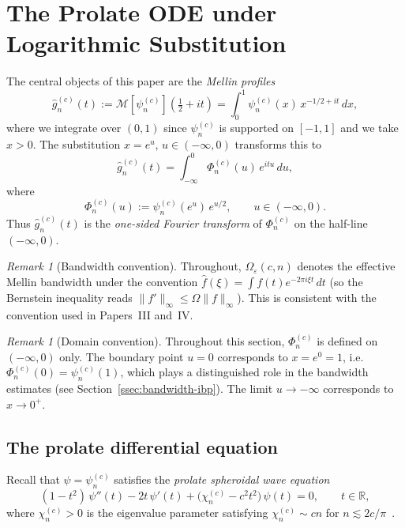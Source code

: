 \documentclass[12pt,a4paper]{amsart}
\theoremstyle{remark}
\newtheorem{remark}[theorem]{Remark}
\begin{document}
\section{The Prolate ODE under Logarithmic Substitution}
\label{sec:ode-transform}

The central objects of this paper are the \emph{Mellin profiles}
\[
\widehat{g}_n^{(c)}(t)
:= \mathcal{M}[\psi_n^{(c)}]\!\left(\tfrac{1}{2}+it\right)
= \int_0^1 \psi_n^{(c)}(x)\,x^{-1/2+it}\,dx,
\]
where we integrate over $(0,1)$ since $\psi_n^{(c)}$ is supported
on $[-1,1]$ and we take $x > 0$.
The substitution $x = e^u$, $u \in (-\infty, 0)$ transforms this to
\begin{equation}
\label{eq:Mellin-Phi}
\widehat{g}_n^{(c)}(t)
= \int_{-\infty}^{0} \Phi_n^{(c)}(u)\,e^{itu}\,du,
\end{equation}
where
\begin{equation}
\label{eq:Phi-def}
\Phi_n^{(c)}(u) := \psi_n^{(c)}(e^u)\,e^{u/2},
\qquad u \in (-\infty, 0).
\end{equation}
Thus $\widehat{g}_n^{(c)}(t)$ is the \emph{one-sided Fourier transform}
of $\Phi_n^{(c)}$ on the half-line $(-\infty,0)$.

\begin{remark}[Bandwidth convention]
\label{rem:omega-convention}
Throughout, $\Omega_\varepsilon(c,n)$ denotes the effective
Mellin bandwidth under the convention
$\hat{f}(\xi) = \int f(t)e^{-2\pi i\xi t}\,dt$
(so the Bernstein inequality reads
$\|f'\|_\infty \le \Omega\|f\|_\infty$).
This is consistent with the convention used in Papers~III and~IV.
\end{remark}

\begin{remark}[Domain convention]
\label{rem:domain}
Throughout this section, $\Phi_n^{(c)}$ is defined on $(-\infty, 0)$
only.
The boundary point $u = 0$ corresponds to $x = e^0 = 1$, i.e.\
$\Phi_n^{(c)}(0) = \psi_n^{(c)}(1)$, which plays a distinguished
role in the bandwidth estimates (see Section~\ref{ssec:bandwidth-ibp}).
The limit $u \to -\infty$ corresponds to $x \to 0^+$.
\end{remark}

\subsection{The prolate differential equation}
\label{ssec:prolate-ode}

Recall that $\psi = \psi_n^{(c)}$ satisfies the
\emph{prolate spheroidal wave equation}
\begin{equation}
\label{eq:PSWE}
(1 - t^2)\,\psi''(t) - 2t\,\psi'(t)
+ \bigl(\chi_n^{(c)} - c^2 t^2\bigr)\,\psi(t) = 0,
\qquad t \in \mathbb{R},
\end{equation}
where $\chi_n^{(c)} > 0$ is the eigenvalue parameter satisfying
$\chi_n^{(c)} \sim cn$ for $n \lesssim 2c/\pi$~\cite{Slepian1961,Landau1962}.
\end{document}
